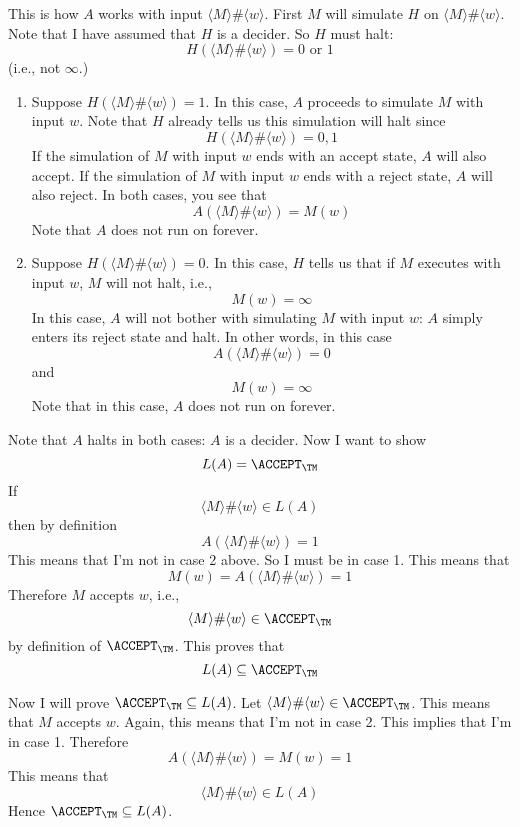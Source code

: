 This is how $A$ works with input $\langle M \rangle \# \langle w \rangle$.
First $M$ will simulate $H$ on 
$\langle M \rangle \# \langle w \rangle$.
Note that I have assumed that $H$ is a decider.
So $H$ must halt:
\[
H(\langle M \rangle \# \langle w \rangle) = 0 \text{ or } 1
\]
(i.e., not $\infty$.)

\begin{enumerate}

\item Suppose $H(\langle M \rangle \# \langle w \rangle) = 1$.
In this case, 
$A$ proceeds to simulate $M$ with input $w$.
Note that $H$ already tells us this simulation will halt since
\[
H(\langle M \rangle \# \langle w \rangle) = 0, 1
\]
If the simulation of $M$ with input $w$ ends with an accept state, 
$A$ will also accept.
If the simulation of $M$ with input $w$ ends with a reject state, 
$A$ will also reject.
In both cases, you see that
\[
A(\langle M \rangle \# \langle w \rangle) = M(w)
\]
Note that $A$ does not run on forever.

\item Suppose $H(\langle M \rangle \# \langle w \rangle) = 0$.
In this case, $H$ tells us that 
if $M$ executes with input $w$, $M$ will not halt, i.e.,
\[
M(w) = \infty
\]
In this case, $A$ will not bother with simulating $M$ with input $w$:
$A$ simply enters its reject state and halt.
In other words, in this case
\[
A(\langle M \rangle \# \langle w \rangle) = 0
\]
and 
\[
M(w) = \infty
\]
Note that in this case, $A$ does not run on forever.
\end{enumerate}

Note that $A$ halts in both cases: $A$ is a decider.
Now I want to show
\[
L(A) = \ACCEPT_\TM
\]
If 
\[
\langle M \rangle \# \langle w \rangle \in L(A)
\]
then by definition
\[
A(\langle M \rangle \# \langle w \rangle) = 1
\]
This means that I'm not in case 2 above.
So I must be in case 1.
This means that 
\[
M(w) = A(\langle M \rangle \# \langle w \rangle) = 1
\]
Therefore $M$ accepts $w$, i.e.,
\[
\langle M \rangle \# \langle w \rangle \in \ACCEPT_\TM
\]
by definition of $\ACCEPT_\TM$.
This proves that
\[
L(A) \subseteq \ACCEPT_\TM
\]

Now I will prove 
$\ACCEPT_\TM \subseteq L(A)$.
Let 
$\langle M \rangle \# \langle w \rangle \in \ACCEPT_\TM$.
This means that $M$ accepts $w$.
Again, this means that I'm not in case 2.
This implies that I'm in case 1.
Therefore
\[
A(\langle M \rangle \# \langle w \rangle) = M(w) = 1
\]
This means that
\[
\langle M \rangle \# \langle w \rangle \in L(A)
\]
Hence $\ACCEPT_\TM \subseteq L(A)$.

